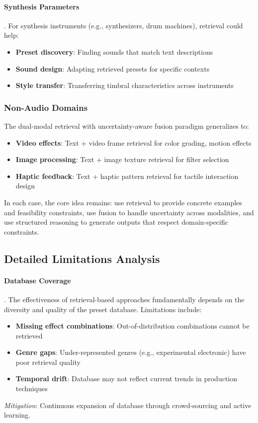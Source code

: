 \paragraph{Synthesis Parameters}. For synthesis instruments (e.g., synthesizers, drum machines), retrieval could help:
\begin{itemize}
	\item \textbf{Preset discovery}: Finding sounds that match text descriptions
	\item \textbf{Sound design}: Adapting retrieved presets for specific contexts
	\item \textbf{Style transfer}: Transferring timbral characteristics across instruments
\end{itemize}

\subsubsection{Non-Audio Domains}

The dual-modal retrieval with uncertainty-aware fusion paradigm generalizes to:
\begin{itemize}
	\item \textbf{Video effects}: Text + video frame retrieval for color grading, motion effects
	\item \textbf{Image processing}: Text + image texture retrieval for filter selection
	\item \textbf{Haptic feedback}: Text + haptic pattern retrieval for tactile interaction design
\end{itemize}

In each case, the core idea remains: use retrieval to provide concrete examples and feasibility constraints, use fusion to handle uncertainty across modalities, and use structured reasoning to generate outputs that respect domain-specific constraints.

\subsection{Detailed Limitations Analysis}

\paragraph{Database Coverage}. The effectiveness of retrieval-based approaches fundamentally depends on the diversity and quality of the preset database. Limitations include:
\begin{itemize}
	\item \textbf{Missing effect combinations}: Out-of-distribution combinations cannot be retrieved
	\item \textbf{Genre gaps}: Under-represented genres (e.g., experimental electronic) have poor retrieval quality
	\item \textbf{Temporal drift}: Database may not reflect current trends in production techniques
\end{itemize}
\textit{Mitigation}: Continuous expansion of database through crowd-sourcing and active learning.

